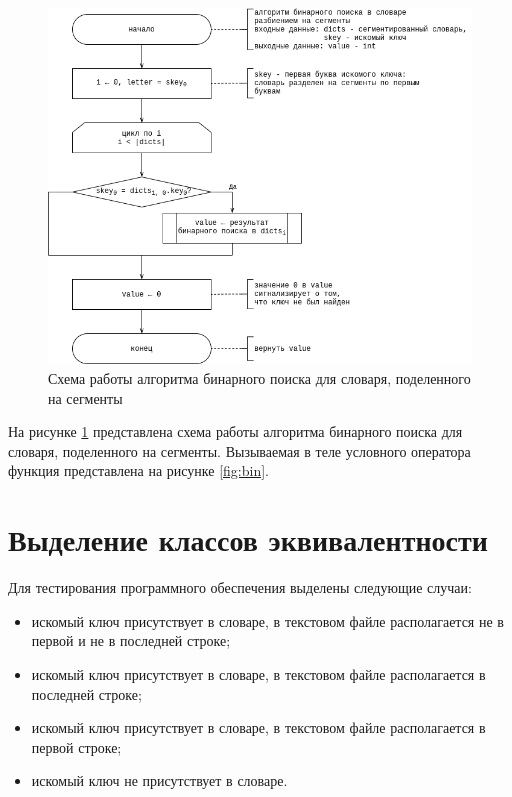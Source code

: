 \begin{center}
	\begin{figure}[H]
		\centering
		\includegraphics[width=0.95\linewidth]{assets/dict-segment.drawio.png}
		\caption{Схема работы алгоритма бинарного поиска для словаря, поделенного на сегменты}
		\label{fig:seg}
	\end{figure}
\end{center}

На рисунке \ref{fig:seg} представлена схема работы алгоритма бинарного поиска для словаря, поделенного на сегменты. Вызываемая в теле условного оператора функция представлена на рисунке \ref{fig:bin}.

\section{Выделение классов эквивалентности}

Для тестирования программного обеспечения выделены следующие случаи:
\begin{itemize}
	\item искомый ключ присутствует в словаре, в текстовом файле располагается не в первой и не в последней строке;
	\item искомый ключ присутствует в словаре, в текстовом файле располагается в последней строке;
	\item искомый ключ присутствует в словаре, в текстовом файле располагается в первой строке;
	\item искомый ключ не присутствует в словаре.
\end{itemize}

